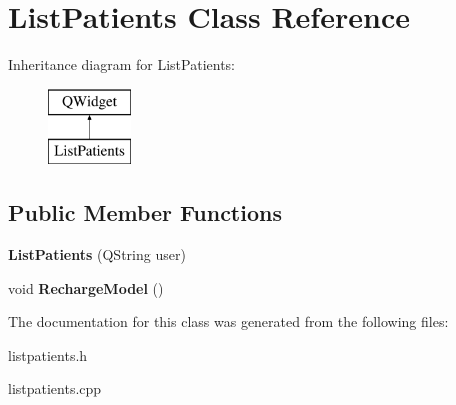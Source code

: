 \hypertarget{class_list_patients}{}\section{List\+Patients Class Reference}
\label{class_list_patients}
Inheritance diagram for List\+Patients\+:\begin{figure}[H]
\begin{center}
\leavevmode
\includegraphics[height=2.000000cm]{class_list_patients}
\end{center}
\end{figure}
\subsection*{Public Member Functions}
\begin{DoxyCompactItemize}
\item 
\mbox{\label{class_list_patients_a71c7d5fe4535c6f9b1d3c8f313902053}} 
{\bfseries List\+Patients} (Q\+String user)
\item 
\mbox{\label{class_list_patients_a7a5cbfc1b5227d8e061ab5c4effffe3e}} 
void {\bfseries Recharge\+Model} ()
\end{DoxyCompactItemize}


The documentation for this class was generated from the following files\+:\begin{DoxyCompactItemize}
\item 
listpatients.\+h\item 
listpatients.\+cpp\end{DoxyCompactItemize}
